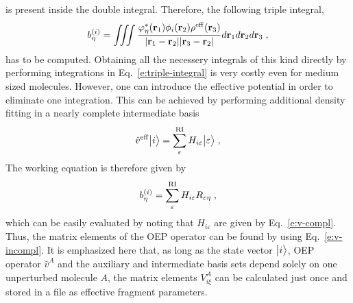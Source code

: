 \documentclass[aip,jcp,amsmath,amssymb,reprint,floatfix]{revtex4-1}
\begin{document}
is present inside the double integral. Therefore, the following triple integral,
%
\begin{equation} \label{e:triple-integral}
 b^{(i)}_\eta = \iiint 
           \frac{ \varphi^*_\eta({\bf r}_1) \phi_i({\bf r}_2)  \rho^{\rm eff}({\bf r}_3) }
            {\vert {\bf r}_1 - {\bf r}_2 \vert \vert {\bf r}_3 - {\bf r}_2 \vert}
           d{\bf r}_1 d{\bf r}_2 d{\bf r}_3 \;,
\end{equation}
%
has to be computed.
Obtaining all the necessery integrals of this kind directly 
by performing integrations in Eq.~\eqref{e:triple-integral} is very costly 
even for medium sized molecules.\cite{Barca.Loos.JCP.2017}
However, one can introduce the effective potential in order to eliminate one integration. 
This can be achieved by performing additional density fitting 
in a nearly complete intermediate basis\cite{Barca.Loos.JCP.2017}  %
%
\begin{equation}
 \hat{v}^{\rm eff} \Ket{i} = \sum_\varepsilon^{\rm RI} H_{i\varepsilon} \Ket{\varepsilon} \;,
\end{equation}
%
The working equation is therefore given by
%
\begin{equation} \label{e:v-compl-b-coeff}
 b^{(i)}_\eta = \sum_\varepsilon^{\rm RI} H_{i\varepsilon} R_{\varepsilon\eta} \;,
\end{equation}
%
which can be easily evaluated by noting that
$H_{i\varepsilon}$ are given by Eq.~\eqref{e:v-compl}.
Thus, the matrix elements of the OEP operator can be found
by using Eq.~\eqref{e:v-incompl}.
It is emphasized here that, as long as the state vector $\Ket{i}$, OEP operator $\hat{v}^A$ 
and the auxiliary and intermediate basis sets depend solely on one unperturbed molecule $A$, the matrix elements
$V^A_{i\xi}$ can be calculated just once and stored in a file as effective fragment parameters.
\end{document}
